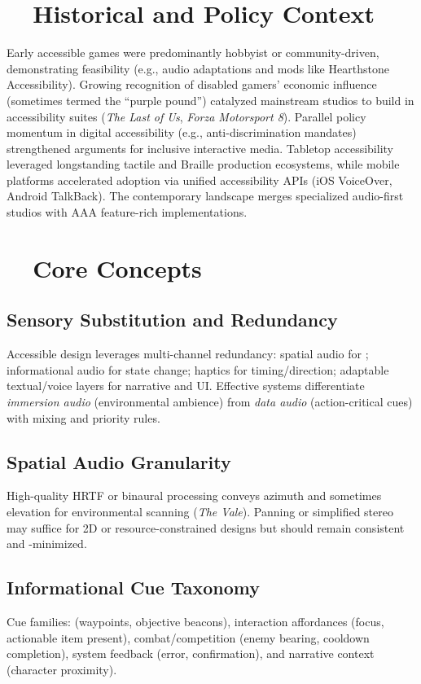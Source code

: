 \section{~~Historical and Policy Context}
\label{sec:gaming-history}
Early accessible games were predominantly hobbyist or community-driven, demonstrating feasibility (e.g., audio adaptations and mods like Hearthstone Accessibility)\supercite{AFBIntroVG}. Growing recognition of disabled gamers’ economic influence (sometimes termed the “purple pound”)\supercite{ScopeGamingReport} catalyzed mainstream studios to build in accessibility suites (\textit{The Last of Us}, \textit{Forza Motorsport 8})\supercite{LudaccessList}. Parallel policy momentum in digital accessibility (e.g., anti-discrimination mandates) strengthened arguments for inclusive interactive media. Tabletop accessibility leveraged longstanding tactile and Braille production ecosystems, while mobile platforms accelerated adoption via unified accessibility APIs (iOS VoiceOver, Android TalkBack). The contemporary landscape merges specialized audio-first studios with AAA feature-rich implementations.

\section{~~Core Concepts}
\label{sec:gaming-core-concepts}
\subsection*{Sensory Substitution and Redundancy}
Accessible design leverages multi-channel redundancy: spatial audio for ; informational audio for state change; haptics for timing/direction; adaptable textual/voice layers for narrative and UI. Effective systems differentiate \emph{immersion audio} (environmental ambience) from \emph{data audio} (action-critical cues) with mixing and priority rules.

\subsection*{Spatial Audio Granularity}
High-quality HRTF or binaural processing conveys azimuth and sometimes elevation for environmental scanning (\textit{The Vale})\supercite{AFBValeReview}. Panning or simplified stereo may suffice for 2D or resource-constrained designs but should remain consistent and -minimized.

\subsection*{Informational Cue Taxonomy}
Cue families:  (waypoints, objective beacons), interaction affordances (focus, actionable item present), combat/competition (enemy bearing, cooldown completion), system feedback (error, confirmation), and narrative context (character proximity).


